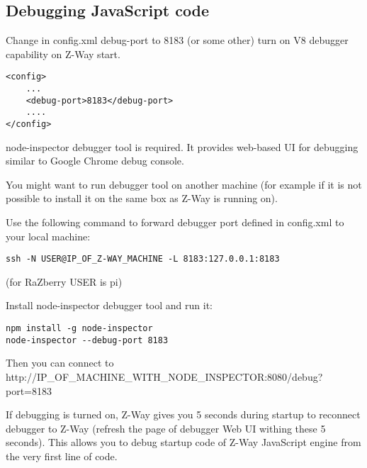\subsection{Debugging JavaScript code}
Change in config.xml debug-port to 8183 (or some other) turn on V8 debugger capability on Z-Way start.

\begin{lstlisting}
<config>
    ...
    <debug-port>8183</debug-port>
    ....
</config>
\end{lstlisting}

node-inspector debugger tool is required. It provides web-based UI for debugging similar to Google Chrome debug console.

You might want to run debugger tool on another machine (for example if it is not possible to install it on the same box as Z-Way is running on).

Use the following command to forward debugger port defined in config.xml to your local machine:
\begin{lstlisting}
ssh -N USER@IP_OF_Z-WAY_MACHINE -L 8183:127.0.0.1:8183
\end{lstlisting}
(for RaZberry USER is pi)

Install node-inspector debugger tool and run it:
\begin{lstlisting}
npm install -g node-inspector
node-inspector --debug-port 8183
\end{lstlisting}

Then you can connect to http://IP\_OF\_MACHINE\_WITH\_NODE\_INSPECTOR:8080/debug?port=8183

If debugging is turned on, Z-Way gives you 5 seconds during startup to reconnect debugger to Z-Way (refresh the page of debugger Web UI withing these 5 seconds).
This allows you to debug startup code of Z-Way JavaScript engine from the very first line of code.
